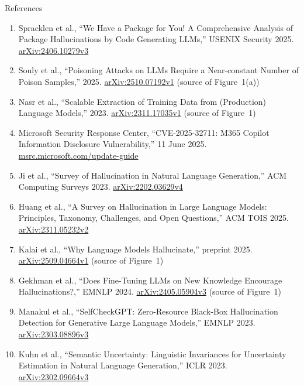\begin{frame}[allowframebreaks]{References}
  \scriptsize
  \begin{enumerate}\setlength{\itemsep}{0.15em}\setlength{\parsep}{0pt}\setlength{\parskip}{0pt}
    \item Spracklen et al., ``We Have a Package for You! A Comprehensive Analysis of Package Hallucinations by Code Generating LLMs,'' USENIX Security 2025. \href{https://arxiv.org/abs/2406.10279v3}{arXiv:2406.10279v3}
    \item Souly et al., ``Poisoning Attacks on LLMs Require a Near-constant Number of Poison Samples,'' 2025. \href{https://arxiv.org/abs/2510.07192v1}{arXiv:2510.07192v1} (source of Figure~1(a))
    \item Nasr et al., ``Scalable Extraction of Training Data from (Production) Language Models,'' 2023. \href{https://arxiv.org/abs/2311.17035v1}{arXiv:2311.17035v1} (source of Figure~1)
    \item Microsoft Security Response Center, ``CVE-2025-32711: M365 Copilot Information Disclosure Vulnerability,'' 11 June 2025. \href{https://msrc.microsoft.com/update-guide/vulnerability/CVE-2025-32711}{msrc.microsoft.com/update-guide}
    \item Ji et al., ``Survey of Hallucination in Natural Language Generation,'' ACM Computing Surveys 2023. \href{https://arxiv.org/abs/2202.03629v4}{arXiv:2202.03629v4}
    \item Huang et al., ``A Survey on Hallucination in Large Language Models: Principles, Taxonomy, Challenges, and Open Questions,'' ACM TOIS 2025. \href{https://arxiv.org/abs/2311.05232v2}{arXiv:2311.05232v2}
    \item Kalai et al., ``Why Language Models Hallucinate,'' preprint 2025. \href{https://arxiv.org/abs/2509.04664v1}{arXiv:2509.04664v1} (source of Figure~1)
    \item Gekhman et al., ``Does Fine-Tuning LLMs on New Knowledge Encourage Hallucinations?,'' EMNLP 2024. \href{https://arxiv.org/abs/2405.05904v3}{arXiv:2405.05904v3} (source of Figure~1)
    \item Manakul et al., ``SelfCheckGPT: Zero-Resource Black-Box Hallucination Detection for Generative Large Language Models,'' EMNLP 2023. \href{https://arxiv.org/abs/2303.08896v3}{arXiv:2303.08896v3}
    \item Kuhn et al., ``Semantic Uncertainty: Linguistic Invariances for Uncertainty Estimation in Natural Language Generation,'' ICLR 2023. \href{https://arxiv.org/abs/2302.09664v3}{arXiv:2302.09664v3}

\end{enumerate}
\end{frame}
